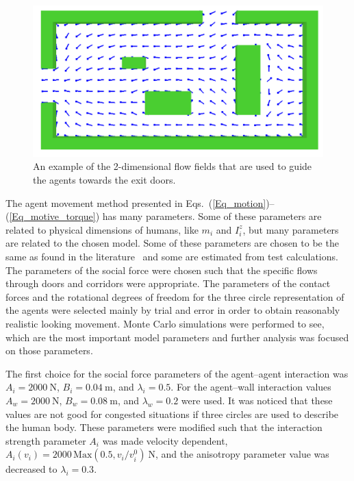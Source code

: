\documentclass[12pt,a4paper,final,twoside]{stylevk}
\begin{document}
%
\begin{figure}[!tb]
  \centerline{\includegraphics[clip=true,width=120mm]{FIGURES/evac_ffield}}
  \caption{An example of the 2-dimensional flow fields that are used
    to guide the agents towards the exit doors.}\label{Fig_EvacFlowField}
\end{figure}
%

The agent movement method presented in
Eqs.~(\ref{Eq_motion})--(\ref{Eq_motive_torque}) has many parameters.
Some of these parameters are related to physical dimensions of humans,
like $m_i$ and $I^z_{i}$, but many parameters are related to the
chosen model.  Some of these parameters are chosen to be the same as
found in the literature~\cite{Helbing00,Langston06} and some are
estimated from test calculations.  The parameters of the social force
were chosen such that the specific flows through doors and corridors
were appropriate.  The parameters of the contact forces and the
rotational degrees of freedom for the three circle representation of
the agents were selected mainly by trial and error in order to obtain
reasonably realistic looking movement.  Monte Carlo simulations were
performed to see, which are the most important model parameters and
further analysis was focused on those parameters.


The first choice for the social force parameters of the agent--agent
interaction was $A_i = 2000~\textrm{N}$, $B_i = 0.04~\textrm{m}$, and
$\lambda_i = 0.5$.  For the agent--wall interaction values $A_w =
2000~\textrm{N}$, $B_w = 0.08~\textrm{m}$, and $\lambda_w = 0.2$ were
used.  It was noticed that these values are not good for congested
situations if three circles are used to describe the human body.
These parameters were modified such that the interaction strength
parameter $A_i$ was made velocity dependent, $A_i(v_i) = 2000\,
\mathrm{Max}(0.5, v_i/v^0_i)~\textrm{N}$, and the anisotropy parameter
value was decreased to $\lambda_i = 0.3$.
\end{document}
